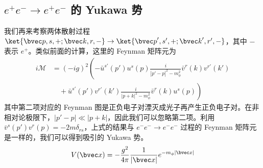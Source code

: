 \subsection{$e^+e^-\rightarrow e^+e^-$ 的 Yukawa 势}
我们再来考察两体散射过程 $\ket{{\bvec p},s,+;{\bvec k},r,-}\rightarrow \ket{{\bvec p}',s',+;{\bvec k}',r',-}$，其中 $-$ 表示 $e^+$。类似前面的计算，这里的 Feynman 矩阵元为
\begin{equation}
\begin{aligned}
i\mathcal{M}&=(-ig)^2 \left(
-\bar u^{s'}(p')u^s(p) \frac{i}{|p'-p|^2-m_\phi^2} \bar v^{r}(k) v^{r'}(k')\right.\\
&\left.\quad + \bar u^{s'}(p')v^{r'}(k') \frac{i}{|p+k|^2-m_\phi^2} \bar v^{r}(k) u^s(p)\right)
\end{aligned}
\end{equation}
其中第二项对应的 Feynman 图是正负电子对湮灭成光子再产生正负电子对。在非相对论极限下，$|p'-p|\ll |p+k|$，因此我们可以忽略第二项。利用 $\bar v^s(p') v^r(p)=-2m \delta_{rs}$，上式的结果与 $e^-e^-\rightarrow e^- e^-$ 过程的 Feynman 矩阵元是一样的，我们可以得到吸引的 Yukawa 势。
\[
V({\bvec x})=-\frac{g^2}{4\pi}\frac{1}{|{\bvec x}|} e^{-m_\phi |{\bvec x}|}
\]